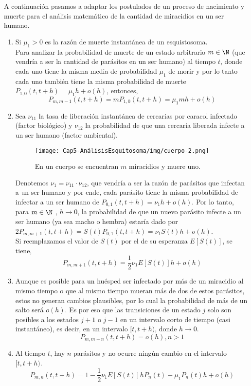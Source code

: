     A continuación pasamos a adaptar los postulados de un proceso de nacimiento y muerte para el análisis matemático de la cantidad de miracidios en un ser humano.
    \begin{enumerate}
        \begin{figure}
          \label{cuerpo1}
            \centering
             \texttt{[image: Cap5-AnálisisEsquitosoma/img/cuerpo-1.png]}
            \caption{En un cuerpo se encuentran $m$ miracidios y muere uno.}
        \end{figure}
        \item Si $\mu_1>0$ es la razón de muerte instantánea de un esquistosoma.\\
        Para analizar la probabilidad de muerte de un estado arbitrario $m\in \N$ (que vendría a ser la cantidad de parásitos en un ser humano) al tiempo $t$, donde cada uno tiene la misma media de probabilidad $\mu_1$ de morir y por lo tanto cada uno también tiene la misma probabilidad de muerte $P_{1,0}(t, t+h)=\mu_1 h + o(h)$, entonces, 
        $$P_{m ,m-1}(t,t+h)=mP_{1,0}(t,t+h)=\mu_1 mh+o(h)$$
         \item  Sea $\nu_{11}$ la tasa de liberación instantánea de cercarias por caracol infectado (factor biológico) y $\nu_{12}$ la probabilidad de que una cercaria liberada infecte a un ser humano (factor ambiental).\\
         \begin{figure}
         \label{cuerpo2}
            \centering
             \texttt{[image: Cap5-AnálisisEsquitosoma/img/cuerpo-2.png]}
            \caption{En un cuerpo se encuentran $m$ miracidios y muere uno.}
        \end{figure}
        Denotemos $\nu_1=\nu_{11}\cdot\nu_{12}$, que vendría a ser la razón de parásitos que infectan a un ser humano y por ende, cada parásito tiene la misma probabilidad de infectar a un ser humano de $P_{0,1}(t, t+h)=\nu_1 h + o(h).$ Por lo tanto, para $m\in\N$ , $h\rightarrow 0$, la probabilidad de que un nuevo parásito infecte a un ser humano (ya sea macho o hembra) estaría dado por  $2P_{m,m+1}(t,t+h)=S(t)P_{0,1}(t, t+h)=\nu_1S(t)h+o(h)$.\\Si reemplazamos el valor de $S(t)$ por el de su esperanza $E[S(t)]$, se tiene,
        $$P_{m,m+1}(t,t+h)=\frac{1}{2}\nu_1E[S(t)]h+o(h)$$
        \item Aunque es posible para un huésped ser infectado por más de un miracidio al mismo tiempo o que al mismo tiempo mueran más de dos de estos parásitos, estos no generan cambios plausibles, por lo cual la probabilidad de más de un salto será $o(h)$. Es por eso que las transiciones de un estado $j$ solo son posibles a los estados $j+1$ o $j-1$ en un intervalo corto de tiempo (casi instantáneo), es decir, en un intervalo $[t,t+h)$, donde $h\rightarrow 0$.
        $$P_{m,m+n}(t,t+h)=o(h), n>1$$
        \item Al tiempo $t$, hay $n$ parásitos y no ocurre ningún cambio en el intervalo $[t,t+h)$.
         $$P_{m,n}(t,t+h)= 1-\frac{1}{2}\nu_1E[S(t)]hP_n(t)-\mu_1 P_{n}(t)h+o(h)$$
    \end{enumerate}

